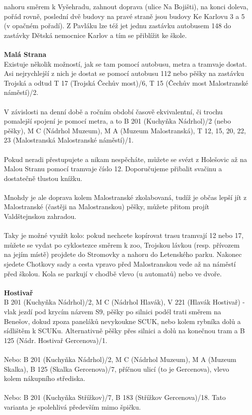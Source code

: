 nahoru směrem k Vyšehradu, zahnout doprava (ulice Na Bojišti), na konci doleva,
pořád rovně, poslední dvě budovy na pravé straně jsou budovy Ke Karlovu 3 a 5 (v
opačném pořadí). Z Pavláku lze též jet jednu zastávku autobusem 148 do zastávky
Dětská nemocnice Karlov a tím se přiblížit ke škole.
\\\\
\textbf{Malá Strana}\\
Existuje několik možností, jak se tam pomocí autobusu, metra a tramvaje dostat.
Asi nejrychlejší z nich je dostat se pomocí autobusu 112 nebo pěšky na zastávku
Trojská a odtud T 17 (Trojská \ra Čechův most)/6, T 15 (Čechův most \ra
Malostranské náměstí)/2.
\\\\
V závislosti na denní době a ročním období časově ekvivalentní, či trochu
pomalejší spojení je pomocí metra, a to B 201 (Kuchyňka \ra Nádrhol)/2 (nebo
pěšky), M C (Nádrhol \ra Muzeum), M A (Muzeum \ra Malostranská), T 12, 15, 20,
22, 23 (Malostranská \ra Malostranské náměstí)/1.
\\\\
Pokud neradi přestupujete a nikam nespěcháte, můžete se svézt z Holešovic až na
Malou Stranu pomocí tramvaje číslo 12. Doporučujeme přibalit svačinu a
dostatečně tlustou knížku.
\\\\
Mnohdy je ale doprava kolem Malostranské zkolabovaná, tudíž je občas lepší jít z
Malostranské (častěji na Malostranskou) pěšky, můžete přitom projít
Valdštejnskou zahradou.
\\\\
Taky je možné využít kolo: pokud nechcete kopírovat trasu tramvají 12 nebo 17,
můžete se vydat po cyklostezce směrem k zoo, Trojskou lávkou (resp. přívozem na
jejím místě) projdete do Stromovky a nahoru do Letenského parku. Nakonec sjedete
Chotkovy sady a cesta vpravo před Malostranskou vede až na náměstí před školou.
Kola se parkují v chodbě vlevo (u automatů) nebo ve dvoře.
\\\\
\textbf{Hostivař}\\
B 201 (Kuchyňka \ra Nádrhol)/2, M C (Nádrhol \ra Hlavák), V 221 (Hlavák \ra
Hostivař) - vlak jezdí pod krycím názvem S9, pěšky po silnici podél trati směrem
na Benešov, dokud zpoza paneláků nevykoukne SCUK, nebo kolem rybníka dolů a
sídlištěm k SCUKu. Alternativně pěšky přes silnici a dolů na konečnou tram a B
125 (Nádr. Hostivař \ra Gercenova)/1.
\\\\
Nebo: B 201 (Kuchyňka \ra Nádrhol)/2, M C (Nádrhol \ra Muzeum), M A (Muzeum \ra
Skalka), B 125 (Skalka \ra Gercenova)/7, příčnou ulicí (to je Gercenova), vlevo
kolem nákupního střediska.
\\\\
Nebo: B 201 (Kuchyňka \ra Střížkov)/7, B 183 (Střížkov \ra Gercenova)/18. Tato
varianta je spolehlivá především mimo špičku.

